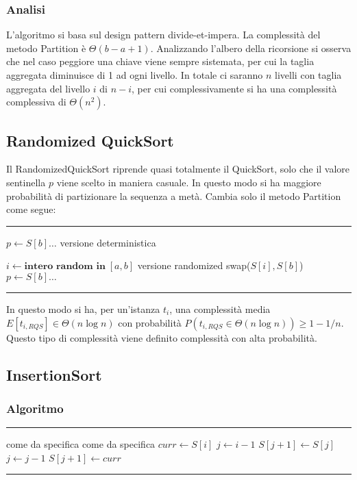 \documentclass[a4paper]{article}
\makeatletter
\newenvironment{algo}[4]{
	\noindent\rule{\textwidth}{0.4pt}
	\begin{algorithmic}[1]
		\addtocounter{ALG@line}{-1}
		\Procedure{#1}{#2}
		\Require #3
		\Ensure #4
		\Statex }{
		\EndProcedure
	\end{algorithmic}
	\rule{\textwidth}{0.4pt}}
\makeatother
\begin{document}
\subsubsection*{Analisi}
L'algoritmo si basa sul design pattern divide-et-impera. La complessità del metodo Partition è \(\Theta(b-a+1)\). Analizzando
l'albero della ricorsione si osserva che nel caso peggiore una chiave viene sempre sistemata, per cui la taglia aggregata
diminuisce di 1 ad ogni livello. In totale ci saranno \(n\) livelli con taglia aggregata del livello \(i\) di \(n-i\), per
cui complessivamente si ha una complessità complessiva di \(\Theta(n^2)\).

\subsection{Randomized QuickSort}
Il RandomizedQuickSort riprende quasi totalmente il QuickSort, solo che il valore sentinella \(p\) viene scelto in maniera casuale.
In questo modo si ha maggiore probabilità di partizionare la sequenza a metà. Cambia solo il metodo Partition come segue:

\noindent\rule{\textwidth}{0.4pt}
\begin{algorithmic}[1]
	\State \(p \gets S[b] \dots\) \Comment versione deterministica
	\Statex
	\addtocounter{ALG@line}{-1}
	\State \(i \gets \textbf{intero random in} \; [a,b]\) \Comment versione randomized
	\State swap(\(S[i],S[b]\))
	\State \(p \gets S[b] \dots\)
\end{algorithmic}
\rule{\textwidth}{0.4pt}
In questo modo si ha, per un'istanza \(t_i\), una complessità media \(E[t_{i,RQS}] \in \Theta(n \log n)\) con probabilità
\(P(t_{i,RQS} \in \Theta(n \log n)) \geq 1 - 1/n\). Questo tipo di complessità viene definito complessità con alta probabilità.

\newpage

\subsection{InsertionSort}
\subsubsection*{Algoritmo}
\begin{algo}{InsertionSort}{$S$}{come da specifica}{come da specifica}
		\State \(curr \gets S[i]\)
		\State \(j \gets i-1\)
			\State \(S[j+1] \gets S[j]\)
			\State \(j \gets j-1\)
		\EndWhile
		\State \(S[j+1] \gets curr\)
	\EndFor
\end{algo}
\end{document}

